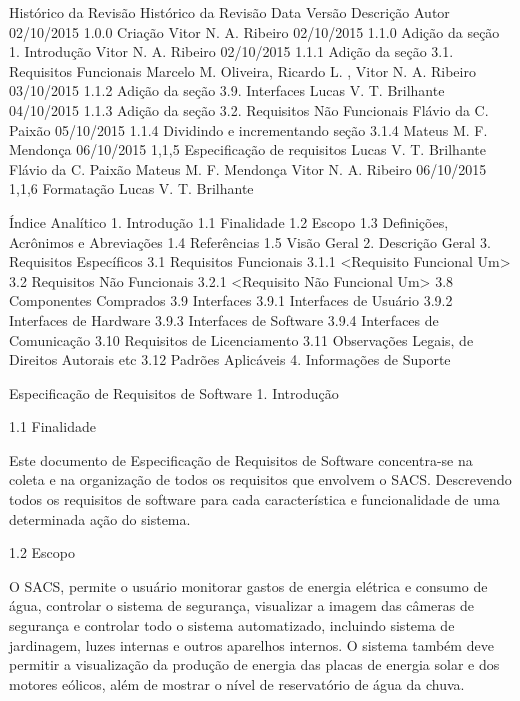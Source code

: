 Histórico da Revisão
Histórico da Revisão
Data
Versão
Descrição
Autor
02/10/2015
1.0.0
Criação
Vitor N. A. Ribeiro
02/10/2015
1.1.0
Adição da seção 1. Introdução
Vitor N. A. Ribeiro
02/10/2015
1.1.1
Adição da seção 3.1. Requisitos Funcionais
Marcelo M. Oliveira,
Ricardo L. ,
Vitor N. A. Ribeiro
03/10/2015
1.1.2
Adição da seção 3.9. Interfaces
Lucas V. T. Brilhante
04/10/2015
1.1.3
Adição da seção 3.2. Requisitos Não Funcionais
Flávio da C. Paixão
05/10/2015
1.1.4
Dividindo e incrementando seção 3.1.4
Mateus M. F. Mendonça
06/10/2015
1,1,5
Especificação de requisitos
Lucas V. T. Brilhante
Flávio da C. Paixão
Mateus M. F. Mendonça
Vitor N. A. Ribeiro
06/10/2015
1,1,6
Formatação
Lucas V. T. Brilhante


















Índice Analítico
1. Introdução         
1.1 Finalidade     
1.2 Escopo     
1.3 Definições, Acrônimos e Abreviações     
1.4 Referências     
1.5 Visão Geral     
2. Descrição Geral    
3. Requisitos Específicos
3.1 Requisitos Funcionais
3.1.1 <Requisito Funcional Um>        
3.2 Requisitos Não Funcionais
3.2.1 <Requisito Não Funcional Um>  
3.8 Componentes Comprados     
3.9 Interfaces     
3.9.1 Interfaces de Usuário           
3.9.2 Interfaces de Hardware           
3.9.3 Interfaces de Software           
3.9.4 Interfaces de Comunicação           
3.10 Requisitos de Licenciamento     
3.11 Observações Legais, de Direitos Autorais etc     
3.12 Padrões Aplicáveis     
4. Informações de Suporte    









Especificação de Requisitos de Software
1.                  Introdução

1.1     Finalidade
    
Este documento de Especificação de Requisitos de Software concentra-se na coleta e na organização de todos os requisitos que envolvem o SACS. Descrevendo todos os requisitos de software para cada característica e funcionalidade de uma determinada ação do sistema.

1.2     Escopo
    
    O SACS, permite o usuário monitorar gastos de energia elétrica e consumo de água, controlar o sistema de segurança, visualizar a imagem das câmeras de segurança e controlar todo o sistema automatizado, incluindo sistema de jardinagem, luzes internas e outros aparelhos internos. O sistema também deve permitir a visualização da produção de energia das placas de energia solar e dos motores eólicos, além de mostrar o nível de reservatório de água da chuva.

